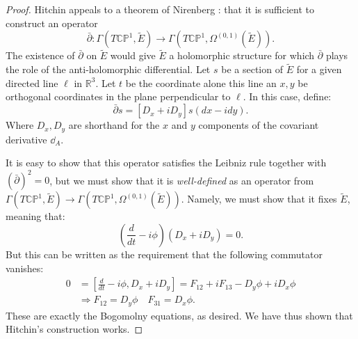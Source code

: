 	\begin{proof}
		Hitchin appeals to a theorem of Nirenberg \cite{nirenberg1957}: that it is sufficient to construct an operator
		$$\bar \partial: \Gamma(T \mathbb{CP}^1, \tilde E) \to \Gamma(T \mathbb{CP}^1, \Omega^{(0,1)}(\tilde E)).$$
		The existence of $\bar \partial$ on $\tilde E$ would give $\tilde E$ a holomorphic structure for which $\bar \partial$ plays the role of the anti-holomorphic differential.
		Let $s$ be a section of $\tilde E$ for a given directed line $\ell$ in $\mathbb R^3$. Let $t$ be the coordinate alone this line an $x,y$ be orthogonal coordinates in the plane perpendicular to $\ell$. In this case, define:
		\begin{equation}
			\bar \partial s = \left[ D_x + i D_y \right] s (dx - i dy).
		\end{equation}
		Where $D_x, D_y$ are shorthand for the $x$ and $y$ components of the covariant derivative $\dd_A$.
		
		It is easy to show that this operator satisfies the Leibniz rule together with $(\bar \partial)^2 = 0$, but we must show that it is \emph{well-defined} as an operator from $\Gamma(T \mathbb{CP}^1, \tilde E) \to \Gamma(T \mathbb{CP}^1, \Omega^{(0,1)}(\tilde E))$. Namely, we must show that it fixes $\tilde E$, meaning that:
		\begin{equation}
			\left(\frac{d}{dt} - i \phi \right)\left(D_x + i D_y \right) = 0.
		\end{equation}
		But this can be written as the requirement that the following commutator vanishes:
		\begin{equation}
			\begin{aligned}
				0 &= \left[\frac{d}{dt} - i \phi, D_x + i D_y \right] = F_{12} + i F_{13} - D_y \phi + i D_x \phi\\
				& \Rightarrow F_{12} = D_y \phi \quad F_{31} = D_x \phi.
			\end{aligned}
		\end{equation}
		These are exactly the Bogomolny equations, as desired. We have thus shown that Hitchin's construction works.
	\end{proof}
